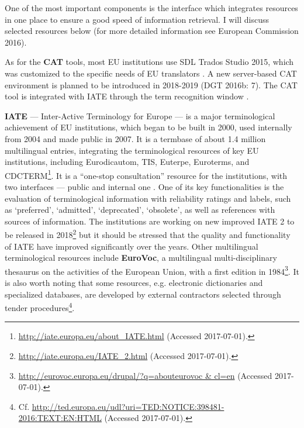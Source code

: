 \documentclass[output=paper]{langsci/langscibook}
\begin{document}
One of the most important components is the interface which integrates resources in one place to ensure a good speed of information retrieval. I will discuss selected resources below (for more detailed information see European Commission 2016).

As for the \textbf{CAT} tools, most EU institutions use SDL Trados Studio 2015, which was customized to the specific needs of EU translators \citep{Trousil2017}. A new server-based CAT environment is planned to be introduced in 2018-2019 (DGT 2016b: 7). The CAT tool is integrated with IATE through the term recognition window \citep{Trousil2017}. 

\textbf{IATE} — Inter-Active Terminology for Europe — is a major terminological achievement of EU institutions, which began to be built in 2000, used internally from 2004 and made public in 2007. It is a termbase of about 1.4 million multilingual entries, integrating the terminological resources of key EU institutions, including Eurodicautom, TIS, Euterpe, Euroterms, and CDCTERM\footnote{\url{http://iate.europa.eu/about_IATE.html} (Accessed 2017-07-01).}. It is a “one-stop consultation” resource for the institutions, with two interfaces — public and internal one \citep{Trousil2017}. One of its key functionalities is the evaluation of terminological information with reliability ratings and labels, such as ‘preferred’, ‘admitted’, ‘deprecated’, ‘obsolete’, as well as references with sources of information. The institutions are working on new improved IATE 2 to be released in 2018\footnote{\url{http://iate.europa.eu/IATE_2.html} (Accessed 2017-07-01).} but it should be stressed that the quality and functionality of IATE have improved significantly over the years. Other multilingual terminological resources include \textbf{EuroVoc}, a multilingual multi-disciplinary thesaurus on the activities of the European Union, with a first edition in 1984\footnote{\url{http://eurovoc.europa.eu/drupal/?q=abouteurovoc & cl=en} (Accessed 2017-07-01).}. It is also worth noting that some resources, e.g. electronic dictionaries and specialized databases, are developed by external contractors selected through tender procedures\footnote{Cf. \url{http://ted.europa.eu/udl?uri=TED:NOTICE:398481-2016:TEXT:EN:HTML} (Accessed 2017-07-01).}.
\end{document}
